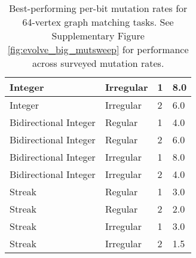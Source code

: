 \begin{table}[!htbp]
\begin{tabular}{l|l|l|l}
Integer               & Irregular                 & 1                      & 8.0                                                                                          \\\hline
Integer               & Irregular                 & 2                      & 6.0                                                                                          \\\hline
Bidirectional Integer & Regular                   & 1                      & 4.0                                                                                          \\\hline
Bidirectional Integer & Regular                   & 2                      & 6.0                                                                                          \\\hline
Bidirectional Integer & Irregular                 & 1                      & 8.0                                                                                          \\\hline
Bidirectional Integer & Irregular                 & 2                      & 4.0                                                                                          \\\hline
Streak                & Regular                   & 1                      & 3.0                                                                                          \\\hline
Streak                & Regular                   & 2                      & 2.0                                                                                          \\\hline
Streak                & Irregular                 & 1                      & 3.0                                                                                          \\\hline
Streak                & Irregular                 & 2                      & 1.5                                                                             \end{tabular}

\caption{
Best-performing per-bit mutation rates for 64-vertex graph matching tasks.
See Supplementary Figure \ref{fig:evolve_big_mutsweep} for performance across surveyed mutation rates.
}
\label{tab:evo_graph_mut_big}


\end{table}
